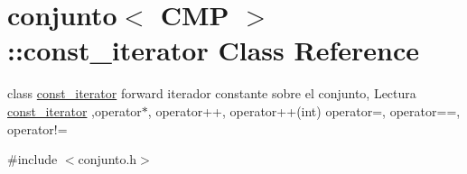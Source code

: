 \hypertarget{classconjunto_1_1const__iterator}{}\section{conjunto$<$ C\+M\+P $>$\+:\+:const\+\_\+iterator Class Reference}
\label{classconjunto_1_1const__iterator}


class \hyperlink{classconjunto_1_1const__iterator}{const\+\_\+iterator} forward iterador constante sobre el conjunto, Lectura \hyperlink{classconjunto_1_1const__iterator}{const\+\_\+iterator} ,operator$\ast$, operator++, operator++(int) operator=, operator==, operator!=  




{\ttfamily \#include $<$conjunto.\+h$>$}

